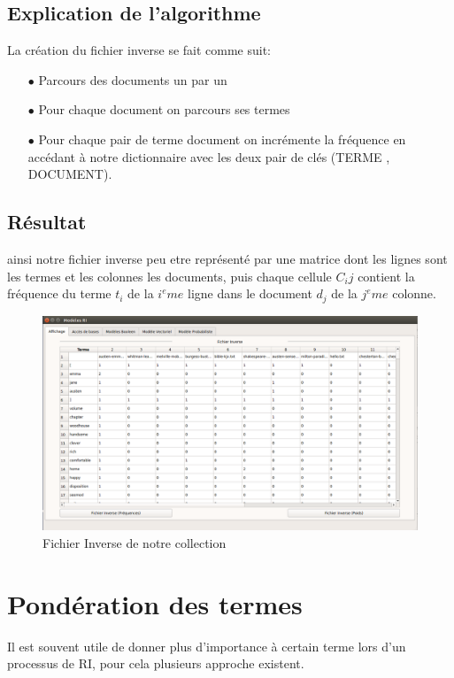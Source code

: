\documentclass[12pt,a4paper,oneside]{article}
\begin{document}
\subsection{Explication de l'algorithme}

La création du fichier inverse se fait comme suit:
\begin{itemize}
\item[$\bullet$] Parcours des documents un par un 
\item[$\bullet$] Pour chaque document on parcours ses termes
\item[$\bullet$] Pour chaque pair de terme document on incrémente la fréquence en accédant à notre dictionnaire avec les deux pair de clés (TERME , DOCUMENT).
\end{itemize}

\subsection{Résultat}
ainsi notre fichier inverse peu etre représenté par une matrice dont les lignes sont les termes et les colonnes les documents, puis chaque cellule $C_ij$ contient la fréquence du terme $t_i$ de la $i^eme$ ligne dans le document $d_j$ de la $j^eme$ colonne.

	\begin{figure}[H]
		\centering
		\includegraphics[scale=0.35]{images/fichierI.png}
		\caption{Fichier Inverse de notre collection}
	\end{figure}







\newpage

\section{Pondération des termes}
Il est souvent utile de donner plus d'importance à certain terme lors d'un processus de RI, pour cela plusieurs approche existent.
\end{document}
